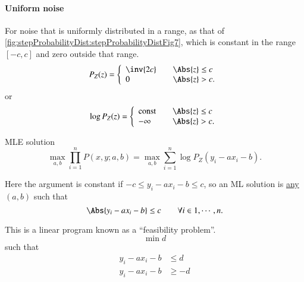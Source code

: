 \paragraph{Uniform noise}
For noise that is uniformly distributed in a range, as that of \cref{fig:stepProbabilityDist:stepProbabilityDistFig7}, which is constant in the range \( [-c,c] \) and zero outside that range.
\begin{equation}\label{eqn:L1introduction:680}
P_Z(z) =
\left\{
\begin{array}{l l}
\inv{2 c} & \quad \mbox{\( \Abs{z} \le c\)} \\
0 & \quad \mbox{\( \Abs{z} > c. \)}
\end{array}
\right.
\end{equation}
or
\begin{equation}\label{eqn:L1introduction:700}
\log P_Z(z) =
\left\{
\begin{array}{l l}
\textrm{const} & \quad \mbox{\( \Abs{z} \le c\)} \\
-\infty & \quad \mbox{\( \Abs{z} > c. \)}
\end{array}
\right.
\end{equation}

MLE solution
\begin{equation}\label{eqn:L1introduction:720}
\max_{a,b} \prod_{i = 1}^n P(x, y; a, b)
=
\max_{a,b} \sum_{i = 1}^n \log P_Z( y_i - a x_i - b ).
\end{equation}

Here the argument is constant if \( -c \le y_i - a x_i - b \le c \), so an ML solution is \underline{any} \( (a,b) \) such that
\begin{equation}\label{eqn:L1introduction:740}
\Abs{ y_i - a x_i - b } \le c \qquad \forall i \in 1, \cdots, n.
\end{equation}

This is a linear program known as a ``feasibility problem''.
\begin{equation}\label{eqn:L1introduction:760}
\min d
\end{equation}
such that
\begin{equation}\label{eqn:L1introduction:780}
\begin{aligned}
y_i - a x_i - b &\le d \\
y_i - a x_i - b &\ge -d
\end{aligned}
\end{equation}

